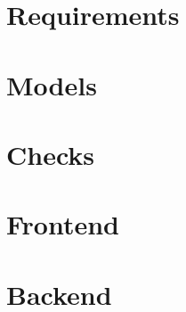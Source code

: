 
\chapter{Requirements}


\chapter{Models}


\chapter{Checks}


\chapter{Frontend}


\chapter{Backend}


